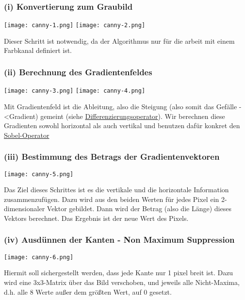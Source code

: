 \subsubsection*{(i) Konvertierung zum Graubild}

\texttt{[image: canny-1.png]}
\texttt{[image: canny-2.png]}

Dieser Schritt ist notwendig, da der Algorithmus nur für die arbeit mit einem Farbkanal definiert ist.

\subsubsection*{(ii) Berechnung des Gradientenfeldes}

\texttt{[image: canny-3.png]}
\texttt{[image: canny-4.png]}

Mit Gradientenfeld ist die Ableitung, also die Steigung (also somit das Gefälle -\textless Gradient) gemeint (siehe \hyperref[sec:difference-operator]{Differenzierungsoperator}). Wir berechnen diese Gradienten sowohl horizontal als auch vertikal und benutzen dafür konkret den \hyperref[sec:sobel-operator]{Sobel-Operator}

\subsubsection*{(iii) Bestimmung des Betrags der Gradientenvektoren}

\texttt{[image: canny-5.png]}

Das Ziel dieses Schrittes ist es die vertikale und die horizontale Information zusammenzufügen. Dazu wird aus den beiden Werten für jedes Pixel ein 2-dimensionaler Vektor gebildet. Dann wird der Betrag (also die Länge) dieses Vektors berechnet. Das Ergebnis ist der neue Wert des Pixels.



\subsubsection*{(iv) Ausdünnen der Kanten - Non Maximum Suppression}

\texttt{[image: canny-6.png]}

Hiermit soll sichergestellt werden, dass jede Kante nur 1 pixel breit ist. Dazu wird eine 3x3-Matrix über das Bild verschoben, und jeweils alle Nicht-Maxima, d.h. alle 8 Werte außer dem größten Wert, auf 0 gesetzt.


